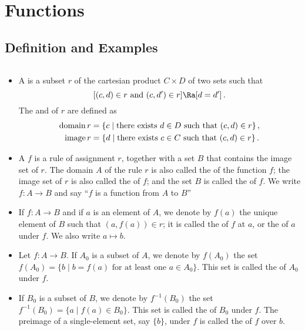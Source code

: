 
\newpage

\section{Functions}

\subsection{Definition and Examples}

\begin{definition}
	$ $
	\begin{itemize}
		\item A  
		is a subset $r$ of the cartesian product $C \times D$ of 
		two sets such that
		\[
			[(c,d) \in r \text{ and } (c,d') \in r] \Ra [d=d']\,.
		\]
		The  and  of $r$ are defined as
		\begin{align}
			\operatorname{domain} r &= \{ c \mid \text{there exists } d \in D
				\text{ such that } (c,d) \in r \}\,, \\
			\operatorname{image} r &= \{ d \mid \text{there exists } c \in C 
			\text{ such that } (c,d) \in r \}\,.
		\end{align}
		
		\item A  $f$ is a rule of 
		assignment $r$, together with a set $B$ that contains the 
		image set of $r$. The domain $A$ of the rule $r$ is also 
		called the  of the function $f$; the image set 
		of $r$ is also called the  of $f$; and the 
		set $B$ is called the 
		 of $f$. We 
		write $f : A \to B$ and say ``$f$ is a function from $A$ 
		to $B$''
		
		\item If $f: A \to B$ and if $a$ is an element of $A$, we 
		denote by $f(a)$ the unique element of $B$ such that $(a, 
		f(a)) \in r$; it is called the 
		 of $f$ at 
		$a$, or the 
		 of $a$ 
		under $f$. We also write $a \mapsto b$.
		
		\item Let $f : A \to B$. If $A_0$ is a subset of $A$, we 
		denote by $f(A_0)$ the set $f(A_0) = \{ b \mid b = f(a) 
		\text{ for at least one } a \in A_0 \}$. This set is 
		called the  
		of $A_0$ under $f$. 
		
		\item If $B_0$ is a subset of $B$, we denote by 
		$f^{-1}(B_0)$ the set $f^{-1}(B_0) = \{ a \mid f(a) \in B_0 
		\}.$ This set is called the 
		 of $B_0$ under $f$. The preimage of a single-element set, say $\{ b \}$, under $f$ is called the  of $f$ over $b$.
	\end{itemize}
\end{definition}

